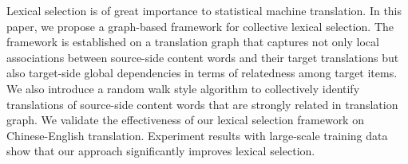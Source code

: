 Lexical selection is of great importance to statistical machine translation. In this paper, we propose a graph-based framework for collective lexical selection. The framework is established on a translation graph that captures not only local associations between source-side content words and their target translations but also target-side global dependencies in terms of relatedness among target items. We also introduce a random walk style algorithm to collectively identify translations of source-side content words that are strongly related in translation graph. We validate the effectiveness of our lexical selection framework on Chinese-English translation. Experiment results with large-scale training data show that our approach significantly improves lexical selection.
